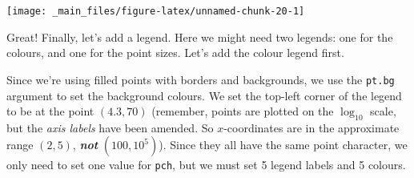 \documentclass[]{book}
\newenvironment{Shaded}{\begin{snugshade}}{\end{snugshade}}
\newcommand{\KeywordTok}[1]{\textcolor[rgb]{0.13,0.29,0.53}{\textbf{{#1}}}}
\newcommand{\DataTypeTok}[1]{\textcolor[rgb]{0.13,0.29,0.53}{{#1}}}
\newcommand{\DecValTok}[1]{\textcolor[rgb]{0.00,0.00,0.81}{{#1}}}
\newcommand{\FloatTok}[1]{\textcolor[rgb]{0.00,0.00,0.81}{{#1}}}
\newcommand{\StringTok}[1]{\textcolor[rgb]{0.31,0.60,0.02}{{#1}}}
\newcommand{\NormalTok}[1]{{#1}}
\theoremstyle{definition}
\theoremstyle{definition}
\theoremstyle{definition}
\theoremstyle{remark}
\begin{document}
\begin{Shaded}
\end{Shaded}

\begin{center}\texttt{[image: \_main\_files/figure-latex/unnamed-chunk-20-1]} \end{center}

Great! Finally, let's add a legend. Here we might need two legends: one
for the colours, and one for the point sizes. Let's add the colour
legend first.

Since we're using filled points with borders and backgrounds, we use the
\texttt{pt.bg} argument to set the background colours. We set the
top-left corner of the legend to be at the point \((4.3, 70)\)
(remember, points are plotted on the \(\log_{10}\) scale, but the
\emph{axis labels} have been amended. So \(x\)-coordinates are in the
approximate range \((2, 5)\), \textbf{\emph{not}} \((100, 10^{5})\)).
Since they all have the same point character, we only need to set one
value for \texttt{pch}, but we must set 5 legend labels and 5 colours.

\begin{Shaded}
\end{Shaded}
\end{document}
